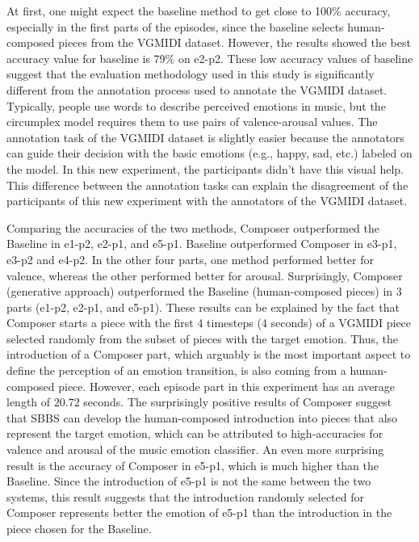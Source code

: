 At first, one might expect the baseline method to get close to 100\% accuracy, especially in the first parts of the episodes, since the baseline selects human-composed pieces from the VGMIDI dataset. However, the results showed the best accuracy value for baseline is 79\% on e2-p2. These low accuracy values of baseline suggest that the evaluation methodology used in this study is significantly different from the annotation process used to annotate the VGMIDI dataset. Typically, people use words to describe perceived emotions in music, but the circumplex model requires them to use pairs of valence-arousal values. The annotation task of the VGMIDI dataset is slightly easier because the annotators can guide their decision with the basic emotions (e.g., happy, sad, etc.) labeled on the model. In this new experiment, the participants didn't have this visual help. This difference between the annotation tasks can explain the disagreement of the participants of this new experiment with the annotators of the VGMIDI dataset.

Comparing the accuracies of the two methods, Composer outperformed the Baseline in e1-p2, e2-p1, and e5-p1. Baseline outperformed Composer in e3-p1, e3-p2 and e4-p2. In the other four parts, one method performed better for valence, whereas the other performed better for arousal. Surprisingly, Composer (generative approach) outperformed the Baseline (human-composed pieces) in 3 parts (e1-p2, e2-p1, and e5-p1). These results can be explained by the fact that Composer starts a piece with the first 4 timesteps (4 seconds) of a VGMIDI piece selected randomly from the subset of pieces with the target emotion. Thus, the introduction of a Composer part, which arguably is the most important aspect to define the perception of an emotion transition, is also coming from a human-composed piece. However, each episode part in this experiment has an average length of $20.72$ seconds. The surprisingly positive results of Composer suggest that SBBS can develop the human-composed introduction into pieces that also represent the target emotion, which can be attributed to high-accuracies for valence and arousal of the music emotion classifier.
An even more surprising result is the accuracy of Composer in e5-p1, which is much higher than the Baseline. Since the introduction of e5-p1 is not the same between the two systems, this result suggests that the introduction randomly selected for Composer represents better the emotion of e5-p1 than the introduction in the piece chosen for the Baseline.

